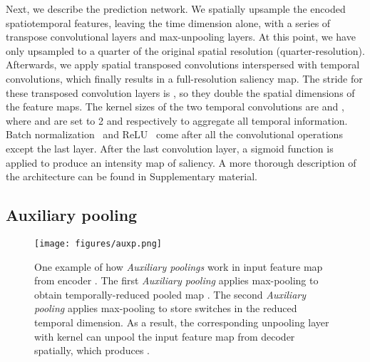 \documentclass[10pt,twocolumn,letterpaper]{article}
\newcommand{\auxpnamet}{Auxiliary pooling}
\newcommand{\auxpname}{\textit{\auxpnamet}}
\begin{document}
Next, we describe the prediction network. We spatially upsample the encoded spatiotemporal features, leaving the time dimension alone, with a series of transpose convolutional layers and max-unpooling layers. At this point, we have only upsampled to a quarter of the original spatial resolution (quarter-resolution). Afterwards, we apply spatial transposed convolutions interspersed with temporal convolutions, which finally results in a full-resolution saliency map. The stride for these transposed convolution layers is , so they double the spatial dimensions of the feature maps. The kernel sizes of the two temporal convolutions are  and , where  and  are set to 2 and  respectively to aggregate all temporal information. Batch normalization~\cite{ioffe2015batch} and ReLU~\cite{nair2010rectified} come after all the convolutional operations except the last layer. After the last convolution layer, a sigmoid function is applied to produce an intensity map of saliency. A more thorough description of the architecture can be found in Supplementary material.

\subsection{\auxpnamet{}} \label{subsec:auxp}

\begin{figure}[!ht]
  \centering
  \texttt{[image: figures/auxp.png]}
  \caption{One example of how \auxpname{\textit{s}} work in  input feature map from encoder . The first \auxpname{}  applies  max-pooling to obtain temporally-reduced pooled map . The second \auxpname{}  applies  max-pooling to store switches  in the reduced temporal dimension. As a result, the corresponding unpooling layer  with  kernel can unpool the input feature map from decoder  spatially, which produces .}
  \label{fig:auxp}
\end{figure}
\end{document}
